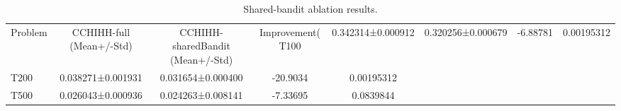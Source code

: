 \begin{table}[t]
\centering
\caption{Shared-bandit ablation results.}
\label{tab:shared_bandit_ablation}
\begin{tabular}{lcccc}
\hline
Problem & CCHIHH-full (Mean+/-Std) & CCHIHH-sharedBandit (Mean+/-Std) & Improvement(%
\hline
T100 & 0.342314±0.000912 & 0.320256±0.000679 & -6.88781 & 0.00195312 \\
T200 & 0.038271±0.001931 & 0.031654±0.000400 & -20.9034 & 0.00195312 \\
T500 & 0.026043±0.000936 & 0.024263±0.008141 & -7.33695 & 0.0839844 \\
\hline
\end{tabular}
\end{table}